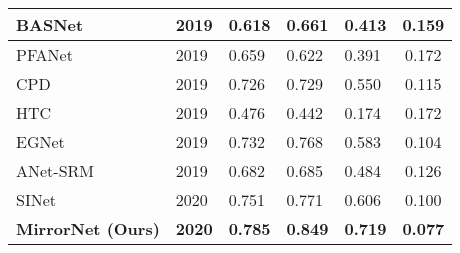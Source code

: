 \documentclass[journal]{IEEEtran}
\begin{document}
\begin{table}[!t]
\begin{tabular}{|l|l|cccc|}
\multicolumn{1}{|l|}{BASNet~\cite{basnet}}           & \multicolumn{1}{l|}{2019}          & \multicolumn{1}{l|}{0.618}                                 & \multicolumn{1}{l|}{0.661}                                 & \multicolumn{1}{l|}{0.413}                                 & \multicolumn{1}{c|}{0.159}                                 \\ \midrule
\multicolumn{1}{|l|}{PFANet~\cite{pfanet}}           & \multicolumn{1}{l|}{2019}          & \multicolumn{1}{l|}{0.659}                                 & \multicolumn{1}{l|}{0.622}                                 & \multicolumn{1}{l|}{0.391}                                 & \multicolumn{1}{c|}{0.172}                                 \\ \midrule
\multicolumn{1}{|l|}{CPD~\cite{cpd}}              & \multicolumn{1}{l|}{2019}          & \multicolumn{1}{l|}{0.726}                                 & \multicolumn{1}{l|}{0.729}                                 & \multicolumn{1}{l|}{0.550}                                 & \multicolumn{1}{c|}{0.115}                                 \\ \midrule
\multicolumn{1}{|l|}{HTC~\cite{htc}}              & \multicolumn{1}{l|}{2019}          & \multicolumn{1}{l|}{0.476}                                 & \multicolumn{1}{l|}{0.442}                                 & \multicolumn{1}{l|}{0.174}                                 & \multicolumn{1}{c|}{0.172}                                 \\ \midrule
\multicolumn{1}{|l|}{EGNet~\cite{egnet}}            & \multicolumn{1}{l|}{2019}          & \multicolumn{1}{l|}{0.732}                                 & \multicolumn{1}{l|}{0.768}                                 & \multicolumn{1}{l|}{0.583}                                 & \multicolumn{1}{c|}{0.104}                                 \\ \midrule
\multicolumn{1}{|l|}{ANet-SRM~\cite{CAMO}}         & \multicolumn{1}{l|}{2019}          & \multicolumn{1}{l|}{0.682}                                 & \multicolumn{1}{l|}{0.685}                                 & \multicolumn{1}{l|}{0.484}                                 & \multicolumn{1}{c|}{0.126}                                 \\ \midrule
\multicolumn{1}{|l|}{SINet~\cite{sinet}}            & \multicolumn{1}{l|}{2020}          & \multicolumn{1}{l|}{0.751}                                 & \multicolumn{1}{l|}{0.771}                                 & \multicolumn{1}{l|}{0.606}                                 & \multicolumn{1}{c|}{0.100}                                 \\ \midrule
\multicolumn{1}{|l|}{\textbf{MirrorNet (Ours)}}        & \multicolumn{1}{l|}{\textbf{2020}}          & \multicolumn{1}{l|}{{\color{blue} \textbf{0.785}}} & \multicolumn{1}{l|}{{\color{blue} \textbf{0.849}}} & \multicolumn{1}{l|}{{\color{blue} \textbf{0.719}}} & \multicolumn{1}{c|}{{\color{blue} \textbf{0.077}}} \\ \bottomrule
             
\end{tabular}
\end{table}
\end{document}
